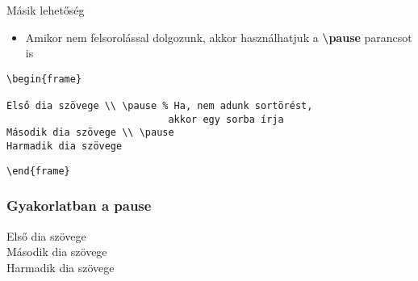 \documentclass[11pt]{beamer}
\newcommand{\tbs}{\textbackslash}
\begin{document}
\begin{frame}[fragile]{Másik lehetőség}
\begin{itemize}
\item Amikor nem felsorolással dolgozunk, akkor használhatjuk a \textbf{\tbs pause} parancsot is
\end{itemize}

\begin{verbatim}
\begin{frame}

Első dia szövege \\ \pause % Ha, nem adunk sortörést, 
							akkor egy sorba írja
Második dia szövege \\ \pause
Harmadik dia szövege
\end{verbatim}
\verb|\end{frame}|
\end{frame}

\begin{frame}
\frametitle{Gyakorlatban a pause}
Első dia szövege \\ \pause
Második dia szövege \\ \pause
Harmadik dia szövege
\end{frame}
\end{document}
